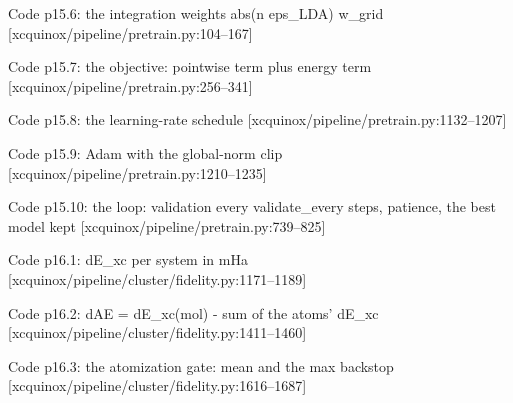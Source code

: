 \begin{frame}[allowframebreaks]{Code p15.6: the integration weights abs(n eps\_LDA) w\_grid [xcquinox/pipeline/pretrain.py:104--167]}
\label{code:p15_6_the_integration_weights_abs_n_eps_lda_w}
\end{frame}
\begin{frame}[allowframebreaks]{Code p15.7: the objective: pointwise term plus energy term [xcquinox/pipeline/pretrain.py:256--341]}
\label{code:p15_7_the_objective_pointwise_term_plus_energy}
\end{frame}
\begin{frame}[allowframebreaks]{Code p15.8: the learning-rate schedule [xcquinox/pipeline/pretrain.py:1132--1207]}
\label{code:p15_8_the_learning_rate_schedule}
\end{frame}
\begin{frame}[allowframebreaks]{Code p15.9: Adam with the global-norm clip [xcquinox/pipeline/pretrain.py:1210--1235]}
\label{code:p15_9_adam_with_the_global_norm_clip}
\end{frame}
\begin{frame}[allowframebreaks]{Code p15.10: the loop: validation every validate\_every steps, patience, the best model kept [xcquinox/pipeline/pretrain.py:739--825]}
\label{code:p15_10_the_loop_validation_every_validate_every}
\end{frame}
\begin{frame}[allowframebreaks]{Code p16.1: dE\_xc per system in mHa [xcquinox/pipeline/cluster/fidelity.py:1171--1189]}
\label{code:p16_1_de_xc_per_system_in_mha}
\end{frame}
\begin{frame}[allowframebreaks]{Code p16.2: dAE = dE\_xc(mol) - sum of the atoms' dE\_xc [xcquinox/pipeline/cluster/fidelity.py:1411--1460]}
\label{code:p16_2_dae_de_xc_mol_sum_of_the_atoms_de_xc}
\end{frame}
\begin{frame}[allowframebreaks]{Code p16.3: the atomization gate: mean and the max backstop [xcquinox/pipeline/cluster/fidelity.py:1616--1687]}
\label{code:p16_3_the_atomization_gate_mean_and_the_max_ba}
\end{frame}
